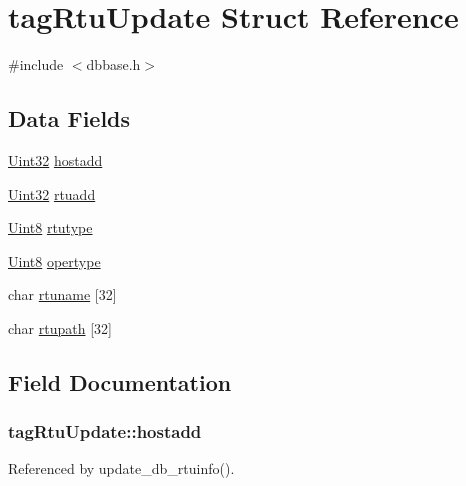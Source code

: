 \hypertarget{structtagRtuUpdate}{\section{tag\-Rtu\-Update Struct Reference}
\label{structtagRtuUpdate}
}


{\ttfamily \#include $<$dbbase.\-h$>$}

\subsection*{Data Fields}
\begin{DoxyCompactItemize}
\item 
\hyperlink{base_8h_a60cf7b3c038ce37a50796e8eaddf0b5f}{Uint32} \hyperlink{structtagRtuUpdate_ad6f35e182b3d9e40e94bd5c18b42607f}{hostadd}
\item 
\hyperlink{base_8h_a60cf7b3c038ce37a50796e8eaddf0b5f}{Uint32} \hyperlink{structtagRtuUpdate_a46b499cc1e9cc261bc55569584d4ccf8}{rtuadd}
\item 
\hyperlink{base_8h_af84840501dec18061d18a68c162a8fa2}{Uint8} \hyperlink{structtagRtuUpdate_a660c0c4c633a277e1ea754f2a070140d}{rtutype}
\item 
\hyperlink{base_8h_af84840501dec18061d18a68c162a8fa2}{Uint8} \hyperlink{structtagRtuUpdate_a18f45ebb99af23a679baff3f74dc5a03}{opertype}
\item 
char \hyperlink{structtagRtuUpdate_ad59c19c96225b0c2d613a242ae4ba2fa}{rtuname} \mbox{[}32\mbox{]}
\item 
char \hyperlink{structtagRtuUpdate_afd323191d1f18ed84f2599242daf5790}{rtupath} \mbox{[}32\mbox{]}
\end{DoxyCompactItemize}


\subsection{Field Documentation}
\hypertarget{structtagRtuUpdate_ad6f35e182b3d9e40e94bd5c18b42607f}{
\subsubsection[{hostadd}]{ tag\-Rtu\-Update\-::hostadd}}\label{structtagRtuUpdate_ad6f35e182b3d9e40e94bd5c18b42607f}


Referenced by update\-\_\-db\-\_\-rtuinfo().

